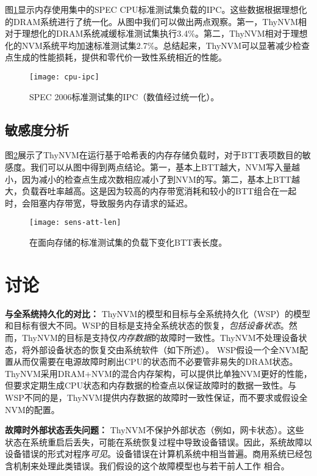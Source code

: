 图\ref{fig:cpu-ipc}显示内存使用集中的SPEC CPU标准测试集负载的IPC。这些数据根据理想化的DRAM系统进行了统一化。从图中我们可以做出两点观察。第一，ThyNVM相对于理想化的DRAM系统减缓标准测试集执行3.4\%。第二，ThyNVM相对于理想化的NVM系统平均加速标准测试集2.7\%。总结起来，ThyNVM可以显著减少检查点生成的性能损耗，提供和零代价一致性系统相近的性能。
 
\begin{figure}[!h]
  \centering
  \texttt{[image: cpu-ipc]}
  \caption{SPEC 2006标准测试集的IPC（数值经过统一化）。}
  \label{fig:cpu-ipc}
\end{figure}
 
\subsection{敏感度分析}

图\ref{fig:sens-att-len}展示了ThyNVM在运行基于哈希表的内存存储负载时，对于BTT表项数目的敏感度。我们可以从图中得到两点结论。第一，基本上BTT越大，NVM写入量越小，因为减小的检查点生成次数相应减小了到NVM的写。第二，基本上BTT越大，负载吞吐率越高。这是因为较高的内存带宽消耗和较小的BTT组合在一起时，会阻塞内存带宽，导致服务内存请求的延迟。

\begin{figure}[!h]
  \centering
  \texttt{[image: sens-att-len]}
  \caption{在面向存储的标准测试集的负载下变化BTT表长度。}
  \label{fig:sens-att-len}
\end{figure}

\section{讨论}
\label{sec:thnvm-discuss}

\textbf{与全系统持久化的对比：}
ThyNVM的模型和目标与全系统持久化（WSP）\cite{Narayanan:2012:WP:2150976.2151018}的模型和目标有很大不同。WSP的目标是支持全系统状态的恢复，\emph{包括设备状态}。然而，ThyNVM的目标是支持仅\emph{内存数据}的故障时一致性。ThyNVM不处理设备状态，将外部设备状态的恢复交由系统软件（如下所述）。 WSP假设一个全NVM配置从而仅需要在电源故障时刷出CPU的状态而不必要管非易失的DRAM状态。
ThyNVM采用DRAM+NVM的混合内存架构，可以提供比单独NVM更好的性能\cite{Qureshi:2009:SHP:1555754.1555760, 6378661}，但要求定期生成CPU状态和内存数据的检查点以保证故障时的数据一致性。与WSP不同的是，ThyNVM提供内存数据的故障时一致性保证，而不要求或假设全NVM的配置。

\textbf{故障时外部状态丢失问题：}
ThyNVM不保护外部状态（例如，网卡状态）。这些状态在系统重启后丢失，可能在系统恢复过程中导致设备错误。因此，系统故障以设备错误的形式对程序\emph{可见}。设备错误在计算机系统中相当普遍\cite{Ghemawat:2003:GFS:945445.945450, Ford:2010:AGD:1924943.1924948}。商用系统已经包含机制来处理此类错误\cite{cpp:exceptions, Robillard:1999:AEF:318773.319251, Ogasawara:2006:EEO:1111596.1111598}。我们假设的这个故障模型也与若干前人工作
\cite{1003568,1003567,Goodenough:1975:EHI:361227.361230,4222585}相合。

